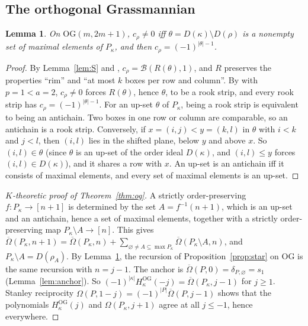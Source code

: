 \documentclass[11pt]{amsart}
\newtheorem{lemma}[theorem]{Lemma}
\theoremstyle{definition}
\theoremstyle{remark}
\newcommand{\OG}{\mathrm{OG}}
\newcommand{\Om}{\Omega}
\newcommand{\Omb}{\overline{\Omega}}
\newcommand{\HOG}{H^{\OG}}
\begin{document}
\subsection{The orthogonal Grassmannian}\label{ssec:og-k}

\begin{lemma}\label{lem:og-corners}
On $\OG(m,2m+1)$, $c_\rho\ne0$ iff $\theta=D(\kappa)\setminus D(\rho)$ is a nonempty set of
maximal elements of $P_\kappa$, and then $c_\rho=(-1)^{|\theta|-1}$.
\end{lemma}

\begin{proof}
By Lemma~\ref{lem:S} and \cite[Cor.~4.4]{BR12}, $c_\rho=\mathcal B(R(\theta),1)$, and $R$
preserves the properties ``rim'' and ``at most $k$ boxes per row and column''. By
\cite[Lemma~4.5]{BR12} with $p=1<a=2$, $c_\rho\ne0$ forces $R(\theta)$, hence $\theta$, to be a
rook strip, and every rook strip has $c_\rho=(-1)^{|\theta|-1}$. For an up-set $\theta$ of
$P_\kappa$, being a rook strip is equivalent to being an antichain. Two boxes in one row or
column are comparable, so an antichain is a rook strip. Conversely, if $x=(i,j)<y=(k,l)$ in
$\theta$ with $i<k$ and $j<l$, then $(i,l)$ lies in the shifted plane, below $y$ and above $x$.
So $(i,l)\in\theta$ (since $\theta$ is an up-set of the order ideal $D(\kappa)$, and
$(i,l)\le y$ forces $(i,l)\in D(\kappa)$), and it shares a row with $x$. An up-set is an
antichain iff it consists of maximal elements, and every set of maximal elements is an up-set.
\end{proof}

\begin{proof}[$K$-theoretic proof of Theorem~\ref{thm:og}]
A strictly order-preserving $f\colon P_\kappa\to[n+1]$ is determined by the set $A=f^{-1}(n+1)$,
which is an up-set and an antichain, hence a set of maximal elements, together with a strictly
order-preserving map $P_\kappa\setminus A\to[n]$. This gives
$\Omb(P_\kappa,n+1)=\Omb(P_\kappa,n)+\sum_{\varnothing\ne A\subseteq\max P_\kappa}\Omb(P_\kappa\setminus A,n)$,
and $P_\kappa\setminus A=D(\rho_A)$. By Lemma~\ref{lem:og-corners}, the recursion of
Proposition~\ref{prop:star} on $\OG$ is the same recursion with $n=j-1$. The anchor is
$\Omb(P,0)=\delta_{P,\varnothing}=s_1$ (Lemma~\ref{lem:anchor}). So
$(-1)^{|\kappa|}\HOG_\kappa(-j)=\Omb(P_\kappa,j-1)$ for $j\ge1$. Stanley reciprocity
$\Om(P,1-j)=(-1)^{|P|}\Omb(P,j-1)$ shows that the polynomials $\HOG_\kappa(j)$ and
$\Om(P_\kappa,j+1)$ agree at all $j\le-1$, hence everywhere.
\end{proof}
\end{document}
